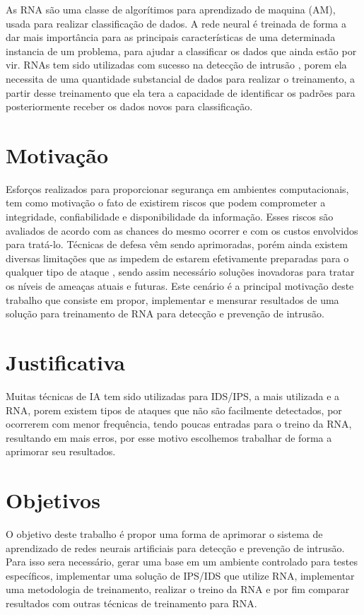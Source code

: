 \documentclass[
	12pt,				%
	openright,			%
	oneside,
	a4paper,			%
	english,			%
	french,				%
	spanish,			%
	brazil				%
	]{abntex2}
\begin{document}
As RNA são uma classe de algorítimos para aprendizado de maquina (AM), usada para realizar classificação de dados. A rede neural é treinada de forma a dar mais importância para as principais características de uma determinada instancia de um problema, para ajudar a classificar os dados que ainda estão por vir. 
RNAs tem sido utilizadas com sucesso na detecção de intrusão \cite{Zhang} \cite{Tong} \cite{Wonil}, porem ela necessita de uma quantidade substancial de dados para realizar o treinamento, a partir desse treinamento que ela tera a capacidade de identificar os padrões para posteriormente receber os dados novos para classificação.


\section{Motivação}

Esforços realizados para proporcionar segurança em ambientes computacionais, tem como motivação o fato de existirem riscos que podem comprometer a integridade, confiabilidade e disponibilidade da informação. 
Esses riscos são avaliados de acordo com as chances do mesmo ocorrer e com os custos envolvidos para tratá-lo. Técnicas de defesa vêm sendo aprimoradas, porém ainda existem diversas limitações que as impedem de estarem efetivamente preparadas para o qualquer tipo de ataque \cite{CeC}, sendo assim necessário  soluções inovadoras para tratar os níveis de ameaças atuais e futuras. 
Este cenário é a principal motivação deste trabalho que consiste em propor, implementar e mensurar resultados de uma solução para treinamento de RNA para detecção e prevenção de intrusão.

\section{Justificativa}

Muitas técnicas de IA tem sido utilizadas para IDS/IPS, a mais utilizada e a RNA\cite{Stampar}, porem existem tipos de ataques que não são facilmente detectados, por ocorrerem com menor frequência, tendo poucas entradas para o treino da RNA\cite{CeC}, resultando em mais erros,  por esse motivo escolhemos trabalhar de forma a aprimorar seu resultados. 


\section{Objetivos}

O objetivo deste trabalho é propor uma forma de aprimorar o sistema de aprendizado de redes neurais artificiais para detecção e prevenção de intrusão. 
Para isso sera necessário, gerar uma base em um ambiente controlado para testes específicos, implementar uma solução de IPS/IDS que utilize RNA, implementar uma metodologia de treinamento, realizar o treino da RNA e por fim comparar resultados com outras técnicas de treinamento para RNA.
\end{document}

